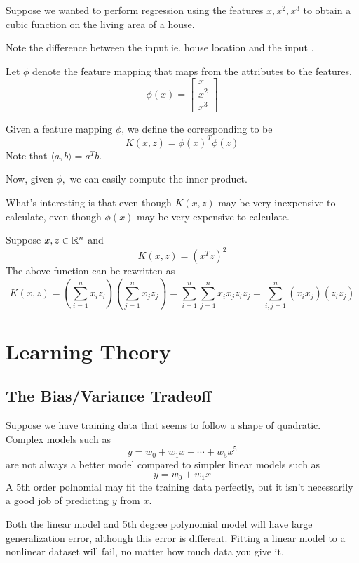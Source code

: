 \documentclass[12pt]{scrartcl}
\begin{document}
Suppose we wanted to perform regression using the features $x, x^2, x^3$ to
obtain a cubic function on the living area of a house.
\begin{note}
    Note the difference between the input  ie. house location and the input .
\end{note}
Let $\phi$ denote the feature mapping that maps from the attributes to the features.
\[\phi(x) = \begin{bmatrix}
        x \\ x^2\\x^3
    \end{bmatrix}\]
\begin{definition}
    Given a feature mapping $\phi$, we define the corresponding  to be
    \[K(x, z) = \phi(x)^T\phi(z)\]
    Note that $\langle a, b \rangle = a^Tb$.
\end{definition}
Now, given $\phi,$ we can easily compute the inner product.
\begin{note}
    What's interesting is that even though $K(x, z)$ may be very inexpensive to calculate, even though $\phi(x)$ may be very expensive to calculate.
\end{note}
\begin{example}
    Suppose $x, z \in \mathbb R^n$ and
    \[K(x, z) = (x^Tz)^2\]
    The above function can be rewritten as
    \[K(x, z) = (\sum_{i=1}^n x_iz_i)(\sum_{j=1}^nx_jz_j) =  \sum_{i=1}^n\sum_{j=1}^nx_ix_jz_iz_j = \sum_{i, j = 1}^n (x_ix_j)(z_iz_j)\]
\end{example}

\section{Learning Theory}

\subsection{The Bias/Variance Tradeoff}

Suppose we have training data that seems to follow a shape of quadratic. Complex models such as 
\[y = w_0 + w_1x + \cdots + w_5x^5\]
are not always a better model compared to simpler linear models such as 
\[y = w_0 + w_1x\]
A 5th order polnomial may fit the training data perfectly, but it isn't necessarily a good job of predicting $y$ from $x$.

\begin{note}
    Both the linear model and 5th degree polynomial model will have large generalization error, although this error is different. Fitting a linear model to a nonlinear dataset will fail, no matter how much data you give it.
\end{note}
\end{document}
